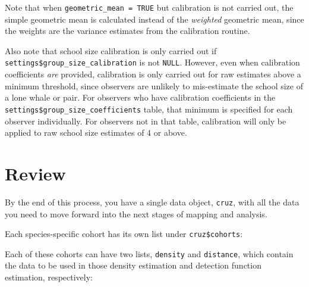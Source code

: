 \documentclass[
]{book}
\newenvironment{Shaded}{\begin{snugshade}}{\end{snugshade}}
\newcommand{\DecValTok}[1]{\textcolor[rgb]{0.00,0.00,0.81}{#1}}
\newcommand{\NormalTok}[1]{#1}
\newcommand{\OperatorTok}[1]{\textcolor[rgb]{0.81,0.36,0.00}{\textbf{#1}}}
\newcommand{\StringTok}[1]{\textcolor[rgb]{0.31,0.60,0.02}{#1}}
\begin{document}
Note that when \texttt{geometric\_mean\ =\ TRUE} but calibration is not carried out, the simple geometric mean is calculated instead of the \emph{weighted} geometric mean, since the weights are the variance estimates from the calibration routine.

Also note that school size calibration is only carried out if \texttt{settings\$group\_size\_calibration} is not \texttt{NULL}. However, even when calibration coefficients \emph{are} provided, calibration is only carried out for raw estimates above a minimum threshold, since observers are unlikely to mis-estimate the school size of a lone whale or pair. For observers who have calibration coefficients in the \texttt{settings\$group\_size\_coefficients} table, that minimum is specified for each observer individually. For observers not in that table, calibration will only be applied to raw school size estimates of 4 or above.

\hypertarget{review}{%
\section*{Review}\label{review}}

By the end of this process, you have a single data object, \texttt{cruz}, with all the data you need to move forward into the next stages of mapping and analysis.

\begin{Shaded}
\end{Shaded}

Each species-specific cohort has its own list under \texttt{cruz\$cohorts}:

\begin{Shaded}
\end{Shaded}

Each of these cohorts can have two lists, \texttt{density} and \texttt{distance}, which contain the data to be used in those density estimation and detection function estimation, respectively:
\end{document}
